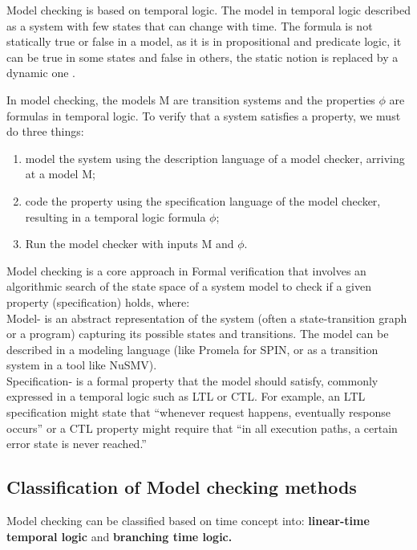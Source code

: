 Model checking is based on temporal logic. 
The model in temporal logic described as a system with few states that can change with time.
The formula is not statically true or false in a model, as it is in propositional and predicate logic,
it can be true in some states and false in others, the static notion is replaced 
by a dynamic one \cite{HuthR1}.

In model checking, the models M are transition systems and the properties $\phi$ are formulas in temporal logic. 
To verify that a system satisfies a property, we must do three things:
\begin{enumerate}
    \item model the system using the description language of a model checker, arriving at a model M;
    \item code the property using the specification language of the model checker, resulting in a temporal logic formula $\phi$;
    \item Run the model checker with inputs M and $\phi$.
\end{enumerate}



Model checking is a core approach in Formal verification that involves an algorithmic search of the state space of a system model to check if a
given property (specification) holds, where:\\
Model- is an abstract representation of the system (often a state-transition graph or a
program) capturing its possible states and transitions. The model can be described in a modeling language
(like Promela for SPIN, or as a transition system in a tool like NuSMV). \\
Specification- is a formal property that the model should satisfy, commonly expressed in a temporal logic such as LTL or CTL. For example, an LTL
specification might state that “whenever request happens, eventually response occurs” or a CTL property
might require that “in all execution paths, a certain error state is never reached.” \\ 


\subsection {Classification of Model checking methods}
Model checking can be classified based on time concept into:
\textbf{linear-time temporal logic } and \textbf{branching time logic.}
\cite{HuthR1}
\\


